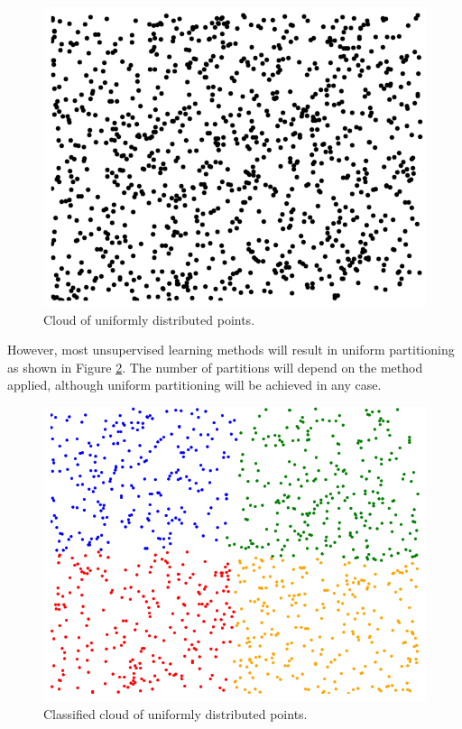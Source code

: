 \begin{figure}[!h]
	\centering
	\includegraphics[scale=0.2]{gfx/Clustering/rand.png} 
	\caption{Cloud of uniformly distributed points.}\label{fig:uniform_cloud}
\end{figure}

However, most unsupervised learning methods will result in uniform partitioning as shown in Figure \ref{fig:uniform_partition}. The number of partitions will depend on the method applied, although uniform partitioning will be achieved in any case.

\begin{figure}[!h]
	\centering
	\includegraphics[scale=0.2]{gfx/Clustering/randClasif.png} 
	\caption{Classified cloud of uniformly distributed points.}\label{fig:uniform_partition}
\end{figure}

